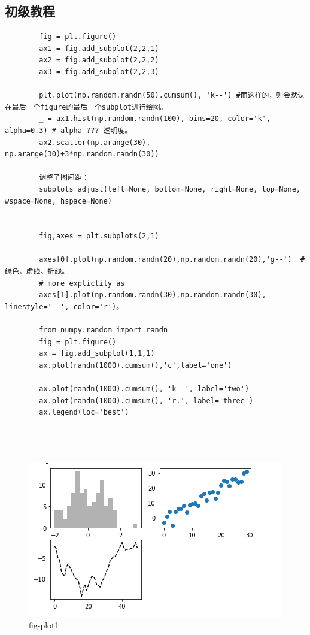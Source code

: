 \documentclass{article}
\begin{document}
	\subsection{初级教程}
	\begin{lstlisting}
		fig = plt.figure()
		ax1 = fig.add_subplot(2,2,1)
		ax2 = fig.add_subplot(2,2,2)
		ax3 = fig.add_subplot(2,2,3)
		
		plt.plot(np.random.randn(50).cumsum(), 'k--') #而这样的，则会默认在最后一个figure的最后一个subplot进行绘图。
		_ = ax1.hist(np.random.randn(100), bins=20, color='k', alpha=0.3) # alpha ??? 透明度。
		ax2.scatter(np.arange(30), np.arange(30)+3*np.random.randn(30))
		
		调整子图间距：
		subplots_adjust(left=None, bottom=None, right=None, top=None, wspace=None, hspace=None)
		
		
		fig,axes = plt.subplots(2,1)
		
		axes[0].plot(np.random.randn(20),np.random.randn(20),'g--')  # 绿色，虚线。折线。
		# more explictily as 
		axes[1].plot(np.random.randn(30),np.random.randn(30), linestyle='--', color='r')。
		
		from numpy.random import randn
		fig = plt.figure()
		ax = fig.add_subplot(1,1,1)
		ax.plot(randn(1000).cumsum(),'c',label='one')
		
		ax.plot(randn(1000).cumsum(), 'k--', label='two')
		ax.plot(randn(1000).cumsum(), 'r.', label='three')
		ax.legend(loc='best')
		
		
		
	\end{lstlisting}
	\begin{figure}[tbhp]
		\centering
		\includegraphics[width=\linewidth]{fig/p1}
		\caption{fig-plot1}
		\label{fig-shili}
	\end{figure}
\end{document}
